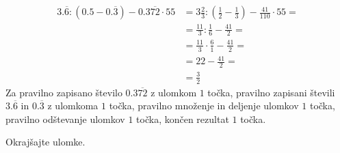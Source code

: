 \documentclass[addpoints]{exam}
\begin{document}
\begin{questions}
\begin{parts}
        \begin{solution}[4cm]
            \begin{align*}
                3.\overline{6}:(0.5-0.\overline{3})-0.3\overline{72}\cdot 55 &= 3\frac{2}{3}:(\frac{1}{2}-\frac{1}{3})-\frac{41}{110}\cdot 55= \\
                                                                            &= \frac{11}{3}:\frac{1}{6}-\frac{41}{2}= \\
                                                                            &= \frac{11}{3}\cdot \frac{6}{1}-\frac{41}{2}= \\
                                                                            &= 22-\frac{41}{2}= \\
                                                                            &= \frac{3}{2}
            \end{align*}
            Za pravilno zapisano število $0.3\overline{72}$ z ulomkom $1$ točka, pravilno zapisani števili $3.\overline{6}$ in $0.\overline{3}$ z ulomkoma $1$ točka, pravilno množenje in deljenje ulomkov $1$ točka, pravilno odštevanje ulomkov $1$ točka, končen rezultat $1$ točka.
        \end{solution}

    \end{parts}



    \newpage

    \question
    Okrajšajte ulomke.
\end{questions}
\end{document}
